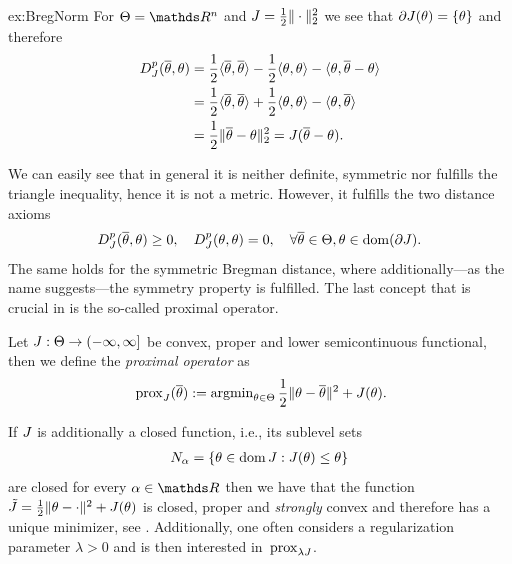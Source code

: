 %
\begin{example}{}{ex:BregNorm}
For $\Param=\R^n$ and $J=\frac{1}{2}\|\cdot\|_2^2$ we see that $\partial J(\theta) = \{\theta\}$ and therefore
%
\begin{align*}
D_J^p(\overline{\theta}, \theta) &= 
\frac{1}{2}\langle \overline{\theta},\overline{\theta}\rangle - 
\frac{1}{2}\langle \theta,\theta\rangle - \langle \theta, \overline{\theta}-\theta\rangle 
\\&=
\frac{1}{2}\langle \overline{\theta},\overline{\theta}\rangle+
\frac{1}{2}\langle \theta,\theta\rangle -
\langle \theta,\overline{\theta}\rangle
\\&=
\frac{1}{2}\|\overline{\theta} - \theta\|_2^2 = J(\overline{\theta} - \theta).
\end{align*}
\end{example}
%
We can easily see that in general it is neither definite, symmetric nor fulfills the triangle inequality, hence it is not a metric. 
However, it fulfills the two distance axioms
\begin{align}
D^p_J(\overline{\theta},\theta) \geq 0,\quad D^p_J(\theta,\theta)=0,\quad\forall\overline{\theta}\in\Theta,\theta\in\operatorname{dom}(\partial J).
\end{align}
%
The same holds for the symmetric Bregman distance, where additionally---as the name suggests---the symmetry property is fulfilled.
%
%
The last concept that is crucial in \cite{bungert2022bregman} is the so-called proximal operator.
%
\begin{definition}{}{}
Let $J:\Theta\to(-\infty,\infty]$  be convex, proper and lower semicontinuous functional, then we define the \emph{proximal operator} as
\begin{align*}
    \,\mathrm{prox}_{J}(\overline{\theta}) := \operatorname{argmin}_{\theta\in\Theta} \frac{1}{2}\|\theta-\overline{\theta}\|^2 + J(\theta).
\end{align*}
\end{definition}
%
If $J$ is additionally a closed function, i.e., its sublevel sets
%
\begin{align*}
N_\alpha = \{\theta\in\operatorname{dom} J: J(\theta)\leq \theta\}
\end{align*} 
%
are closed for every $\alpha\in\R$ then we have that the function $\tilde J = \frac{1}{2}\|\theta -\cdot\|^2 + J(\theta)$ is closed, proper and \emph{strongly} convex and therefore has a unique minimizer, see \cite[Thm. 27.1]{rockafellar1997convex}. Additionally, one often considers a regularization parameter $\lambda>0$ and is then interested in $\,\mathrm{prox}_{\lambda J}$.
